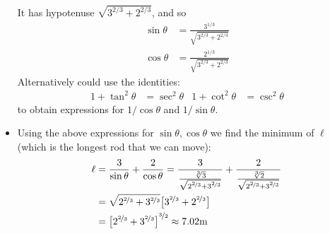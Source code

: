 \begin{eg}
\begin{itemize}
\begin{efig}
\begin{center}
 \end{center}
\end{efig}
It has hypotenuse $\sqrt{ 3^{2/3} + 2^{2/3}}$, and so
\begin{align*}
  \sin \theta &= \frac{3^{1/3}}{\sqrt{3^{2/3}+2^{2/3}}} \\
  \cos \theta &= \frac{2^{1/3}}{\sqrt{3^{2/3}+2^{2/3}}}
\end{align*}
Alternatively could use the identities:
\begin{align*}
  1 + \tan^2\theta &= \sec^2\theta & 1+\cot^2\theta &= \csc^2\theta
\end{align*}
to obtain expressions for $1/\cos\theta$ and $1/\sin\theta$.

\item Using the above expressions for $\sin\theta, \cos\theta$ we find the minimum of
$\ell$ (which is the longest rod that we can move):
\begin{align*}
  \ell &= \frac{3}{\sin\theta} + \frac{2}{\cos\theta}
=\frac{3}{ \frac{\root 3\of 3}
         {\sqrt{2^{\nicefrac{2}{3}}+3^{\nicefrac{2}{3}}}} }
+\frac{2}{ \frac{\root 3\of 2}{\sqrt{2^{\nicefrac{2}{3}}+3^{\nicefrac{2}{3}}}} }\\
& =\sqrt{2^{\nicefrac{2}{3}}+3^{\nicefrac{2}{3}}}
                 \big[3^{\nicefrac{2}{3}}+2^{\nicefrac{2}{3}}\big] \\
& ={\big[2^{\nicefrac{2}{3}}+3^{\nicefrac{2}{3}}\big]}^{\nicefrac{3}{2}}
\approx 7.02\text{m}
\end{align*}

\end{itemize}

\end{eg}
\goodbreak

